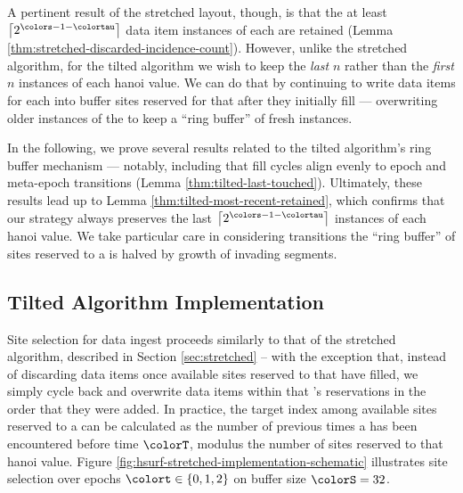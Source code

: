 A pertinent result of the stretched layout, though, is that the at least $\left\lceil2^{\colors - 1 - \colortau}\right\rceil$ data item instances of each \hv{} are retained (Lemma \ref{thm:stretched-discarded-incidence-count}).
However, unlike the stretched algorithm, for the tilted algorithm we wish to keep the \textit{last} $n$ rather than the \textit{first} $n$ instances of each hanoi value.
We can do that by continuing to write data items for each \hv{} into buffer sites reserved for that \hv{} after they initially fill --- overwriting older instances of the \hv{} to keep a ``ring buffer'' of fresh \hv{} instances.

In the following, we prove several results related to the tilted algorithm's ring buffer mechanism --- notably, including that fill cycles align evenly to epoch and meta-epoch transitions (Lemma \ref{thm:tilted-last-touched}).
Ultimately, these results lead up to Lemma \ref{thm:tilted-most-recent-retained}, which confirms that our strategy always preserves the last $\left\lceil 2^{\colors - 1 - \colortau} \right\rceil$ instances of each hanoi value.
We take particular care in considering transitions the ``ring buffer'' of sites reserved to a \hv{} is halved by growth of invading segments.











\subsection{Tilted Algorithm Implementation}
\label{sec:tilted-implementation}



Site selection for data ingest proceeds similarly to that of the stretched algorithm, described in Section \ref{sec:stretched} -- with the exception that, instead of discarding data items once available sites reserved to that \hv{} have filled, we simply cycle back and overwrite data items within that \hv{}'s reservations in the order that they were added.
In practice, the target index among available sites reserved to a \hv{} can be calculated as the number of previous times a \hv{} has been encountered before time $\colorT$, modulus the number of sites reserved to that hanoi value.
Figure \ref{fig:hsurf-stretched-implementation-schematic} illustrates site selection over epochs $\colort \in \{0,1,2\}$ on buffer size $\colorS=32$.

